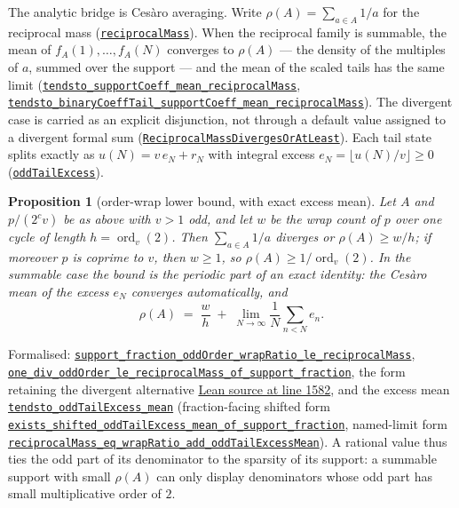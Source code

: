 \documentclass[11pt]{article}
\newcommand{\commit}{81150c1c6fdd4cd51e76d3aa0de344341e0e9e7c}
\newcommand{\repobase}{https://github.com/wcook04/plectis-lean-erdos249-257/blob/\commit}
\newcommand{\PK}{Erdos249257}
\newcommand{\lref}[3]{\href{\repobase/\PK/#1\#L#2}{\nolinkurl{#3}}}
\newcommand{\lrefx}[3]{\href{\repobase/\PK/#1\#L#2}{\nolinkurl{#3}}}
\newcommand{\lloc}[2]{\href{\repobase/\PK/#1\#L#2}{Lean source at line #2}}
\newtheorem{proposition}[theorem]{Proposition}
\theoremstyle{definition}
\theoremstyle{remark}
\begin{document}
The analytic bridge is Ces\`aro averaging. Write $\rho(A)=\sum_{a\in A}1/a$
for the reciprocal mass
(\lrefx{RationalSupportCarrySkeleton.lean}{790}{reciprocalMass}). When the
reciprocal family is summable, the mean of $f_A(1),\dots,f_A(N)$ converges to
$\rho(A)$ --- the density of the multiples of $a$, summed over the support ---
and the mean of the scaled tails has the same limit
(\lref{RationalSupportCarrySkeleton.lean}{945}{tendsto_supportCoeff_mean_reciprocalMass},
\lrefx{RationalSupportCarrySkeleton.lean}{1036}{tendsto_binaryCoeffTail_supportCoeff_mean_reciprocalMass}).
The divergent case is carried as an explicit disjunction, not through a
default value assigned to a divergent formal sum
(\lrefx{RationalSupportCarrySkeleton.lean}{796}{ReciprocalMassDivergesOrAtLeast}).
Each tail state splits exactly as $u(N)=v\,e_N+r_N$ with integral excess
$e_N=\lfloor u(N)/v\rfloor\ge0$
(\lrefx{RationalSupportCarrySkeleton.lean}{501}{oddTailExcess}).

\begin{proposition}[order-wrap lower bound, with exact excess mean]\label{res:orderwrap}
Let $A$ and $p/(2^c v)$ be as above with $v>1$ odd, and let $w$ be the wrap
count of $p$ over one cycle of length $h=\operatorname{ord}_v(2)$. Then
$\sum_{a\in A}1/a$ diverges or $\rho(A)\ge w/h$; if moreover $p$ is coprime to
$v$, then $w\ge1$, so $\rho(A)\ge1/\operatorname{ord}_v(2)$. In the summable
case the bound is the periodic part of an exact identity: the Ces\`aro mean of
the excess $e_N$ converges automatically, and
\[
\rho(A)\;=\;\frac{w}{h}\;+\;\lim_{N\to\infty}\frac1N\sum_{n<N}e_n .
\]
\end{proposition}
\noindent Formalised:
\lref{RationalSupportCarrySkeleton.lean}{1454}{support_fraction_oddOrder_wrapRatio_le_reciprocalMass},
\lref{RationalSupportCarrySkeleton.lean}{1478}{one_div_oddOrder_le_reciprocalMass_of_support_fraction},
the form retaining the divergent alternative
\lloc{RationalSupportCarrySkeleton.lean}{1582},
and the excess mean
\lref{RationalSupportCarrySkeleton.lean}{1334}{tendsto_oddTailExcess_mean}
(fraction-facing shifted form
\lrefx{RationalSupportCarrySkeleton.lean}{1577}{exists_shifted_oddTailExcess_mean_of_support_fraction},
named-limit form
\lrefx{RationalSupportCarrySkeleton.lean}{1353}{reciprocalMass_eq_wrapRatio_add_oddTailExcessMean}).
A rational value thus ties the odd part of its denominator to the sparsity of
its support: a summable support with small $\rho(A)$ can only display
denominators whose odd part has small multiplicative order of $2$.
\end{document}
